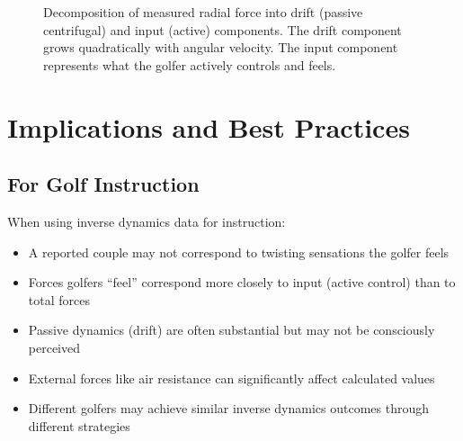 \documentclass[11pt,a4paper]{article}
\theoremstyle{definition}
\theoremstyle{plain}
\begin{document}
\begin{figure}[H]
\centering
{}
\caption{Decomposition of measured radial force into drift (passive centrifugal) and input (active) components. The drift component grows quadratically with angular velocity. The input component represents what the golfer actively controls and feels.}
\label{fig:drift_input_decomposition}
\end{figure}

\section{Implications and Best Practices}

\subsection{For Golf Instruction}

When using inverse dynamics data for instruction:
\begin{itemize}
    \item A reported couple may not correspond to twisting sensations the golfer feels
    \item Forces golfers ``feel'' correspond more closely to input (active control) than to total forces
    \item Passive dynamics (drift) are often substantial but may not be consciously perceived
    \item External forces like air resistance can significantly affect calculated values
    \item Different golfers may achieve similar inverse dynamics outcomes through different strategies
\end{itemize}
\end{document}
